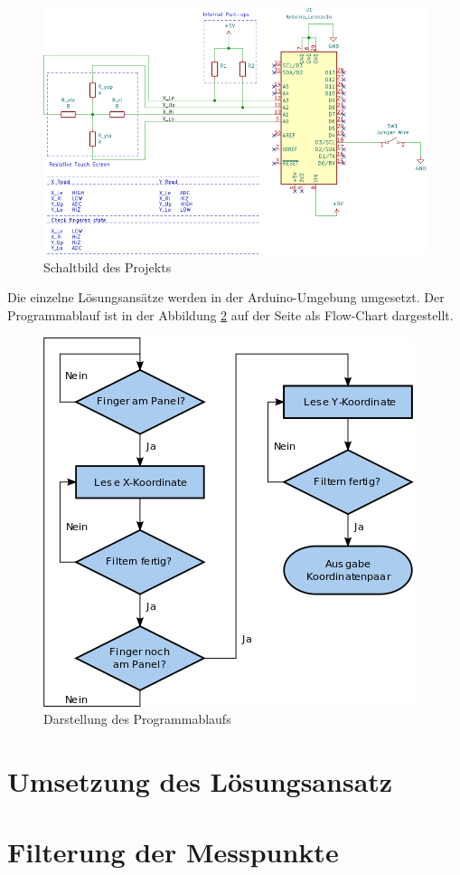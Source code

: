\begin{figure}[ht!]
    \centering
    \includegraphics[width=\linewidth]{fig/schaltbild.png}
    \caption{Schaltbild des Projekts}
    \label{fig:schaltbild}
\end{figure}
Die einzelne Lösungsansätze werden in der Arduino-Umgebung umgesetzt. Der Programmablauf ist in der Abbildung \ref{fig:flowchart} auf der Seite \pageref{fig:flowchart} als Flow-Chart dargestellt.

\begin{figure}
    \centering
    \includegraphics[scale=0.45]{fig/flow_chart.png}
    \caption{Darstellung des Programmablaufs}
    \label{fig:flowchart}
\end{figure}
\section{Umsetzung des Lösungsansatz}
\section{Filterung der Messpunkte}